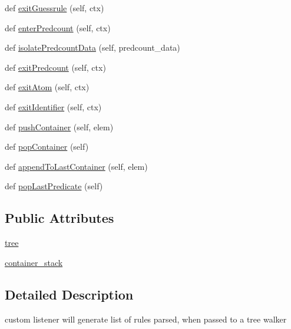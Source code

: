 \begin{DoxyCompactItemize}
\item 
def \hyperlink{classparse__asp__rules_1_1_rule_listener_a718018993ecac59520aebec7ae63b73d}{exit\+Guessrule} (self, ctx)
\item 
def \hyperlink{classparse__asp__rules_1_1_rule_listener_a1b2fe6298c4cd441d99211f145b34bd2}{enter\+Predcount} (self, ctx)
\item 
def \hyperlink{classparse__asp__rules_1_1_rule_listener_a73dd7410307759306b77579ef6a4b11c}{isolate\+Predcount\+Data} (self, predcount\+\_\+data)
\item 
def \hyperlink{classparse__asp__rules_1_1_rule_listener_a5ab9bf88929727fb53a67a234394317a}{exit\+Predcount} (self, ctx)
\item 
def \hyperlink{classparse__asp__rules_1_1_rule_listener_a6299867c4fdaca8e5698fadb6e9618f4}{exit\+Atom} (self, ctx)
\item 
def \hyperlink{classparse__asp__rules_1_1_rule_listener_a03c289b66acb0f75f2ed8cccd9f21cc7}{exit\+Identifier} (self, ctx)
\item 
def \hyperlink{classparse__asp__rules_1_1_rule_listener_afc4c08e2209e839cafd4e8afe38693f8}{push\+Container} (self, elem)
\item 
def \hyperlink{classparse__asp__rules_1_1_rule_listener_aad428c830c9b3d41e9e99501156a281f}{pop\+Container} (self)
\item 
def \hyperlink{classparse__asp__rules_1_1_rule_listener_adc1a28101151b8adf07697d8a4a8dd5d}{append\+To\+Last\+Container} (self, elem)
\item 
def \hyperlink{classparse__asp__rules_1_1_rule_listener_a0f1c48df98e762c6f0522acf0ded7a33}{pop\+Last\+Predicate} (self)
\end{DoxyCompactItemize}
\subsection*{Public Attributes}
\begin{DoxyCompactItemize}
\item 
\hyperlink{classparse__asp__rules_1_1_rule_listener_a6923e5b023bb9c94836a12a3bb80f184}{tree}
\item 
\hyperlink{classparse__asp__rules_1_1_rule_listener_a018b6fd2188baceee8498a529d0df9f8}{container\+\_\+stack}
\end{DoxyCompactItemize}


\subsection{Detailed Description}
\begin{DoxyVerb}custom listener will generate list of rules parsed, when passed to a tree walker \end{DoxyVerb}
 

